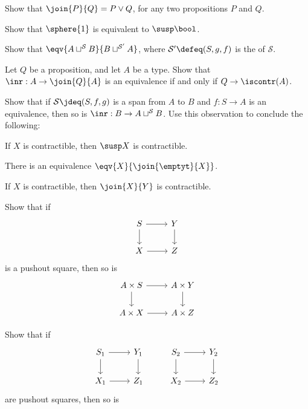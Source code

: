 \begin{exercises}
\item Show that $\join{P}{Q}= P\lor Q$, for any two propositions $P$ and $Q$.
\item Show that $\sphere{1}$ is equivalent to $\susp\bool$. 
\item Show that $\eqv{A\sqcup^{\mathcal{S}} B}{B\sqcup^{\mathcal{S}'} A}$, where $\mathcal{S'}\defeq (S,g,f)$ is the  of $\mathcal{S}$. 
\item Let $Q$ be a proposition, and let $A$ be a type. Show that $\inr:A\to \join{Q}{A}$ is an equivalence if and only if $Q\to\iscontr(A)$.
\item Show that if $\mathcal{S}\jdeq(S,f,g)$ is a span from $A$ to $B$ and $f:S\to A$ is an equivalence, then so is $\inr:B\to A\sqcup^\mathcal{S} B$. Use this observation to conclude the following:
\begin{subexenum}
\item If $X$ is contractible, then $\susp X$ is contractible.
\item There is an equivalence $\eqv{X}{\join{\emptyt}{X}}$.
\item If $X$ is contractible, then $\join{X}{Y}$ is contractible. 
\end{subexenum}
\item Show that if
\begin{equation*}
\begin{tikzcd}
S \arrow[r] \arrow[d] & Y \arrow[d] \\
X \arrow[r] & Z
\end{tikzcd}
\end{equation*}
is a pushout square, then so is
\begin{equation*}
\begin{tikzcd}
A\times S \arrow[r] \arrow[d] & A\times Y \arrow[d] \\
A\times X \arrow[r] & A\times Z
\end{tikzcd}
\end{equation*}
\item Show that if
\begin{equation*}
\begin{tikzcd}
S_1 \arrow[r] \arrow[d] & Y_1 \arrow[d] & S_2 \arrow[r] \arrow[d] & Y_2 \arrow[d] \\
X_1 \arrow[r] & Z_1 & X_2 \arrow[r] & Z_2
\end{tikzcd}
\end{equation*}
are pushout squares, then so is
\begin{equation*}

\end{equation*}
\end{exercises}
